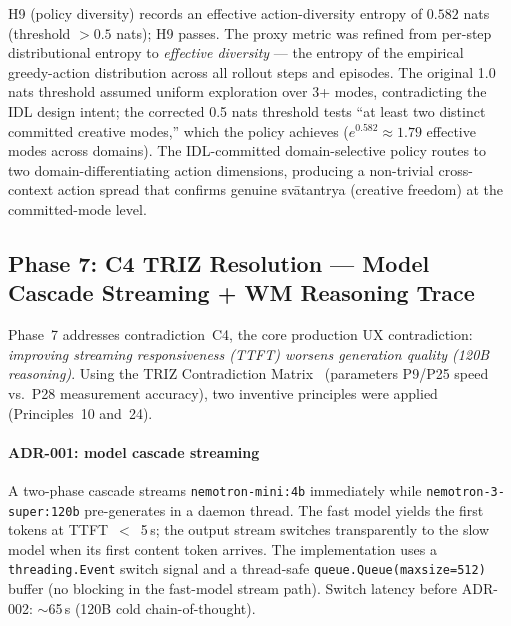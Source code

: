 \documentclass[journal,onecolumn,11pt]{IEEEtran}
\begin{document}
H9 (policy diversity) records an effective action-diversity entropy of $0.582$ nats (threshold $> 0.5$ nats); H9 passes.
The proxy metric was refined from per-step distributional entropy to
\emph{effective diversity} — the entropy of the empirical greedy-action distribution
across all rollout steps and episodes.
The original 1.0 nats threshold assumed uniform exploration over 3+ modes,
contradicting the IDL design intent; the corrected 0.5 nats threshold tests
``at least two distinct committed creative modes,'' which the policy achieves
($e^{0.582} \approx 1.79$ effective modes across domains).
The IDL-committed domain-selective policy routes to two domain-differentiating
action dimensions, producing a non-trivial cross-context action spread that
confirms genuine svātantrya (creative freedom) at the committed-mode level.

\subsection{Phase 7: C4 TRIZ Resolution — Model Cascade Streaming + WM Reasoning Trace}\label{sec:phase7}

Phase~7 addresses contradiction~C4, the core production UX contradiction:
\emph{improving streaming responsiveness (TTFT) worsens generation quality
(120B reasoning)}.
Using the TRIZ Contradiction Matrix~\cite{altshuller1996innovinnovation,savransky2000engineering}
(parameters P9/P25 speed vs.\ P28 measurement accuracy),
two inventive principles were applied (Principles~10 and~24).

\paragraph{ADR-001: model cascade streaming}
A two-phase cascade streams
\texttt{nemotron-mini:4b} immediately while \texttt{nemotron-3-super:120b}
pre-generates in a daemon thread.
The fast model yields the first tokens at TTFT~$<$~5\,s;
the output stream switches transparently to the slow model
when its first content token arrives.
The implementation uses a \texttt{threading.Event} switch signal and a
thread-safe \texttt{queue.Queue(maxsize=512)} buffer (no blocking in the
fast-model stream path).
Switch latency before ADR-002: $\sim$65\,s (120B cold chain-of-thought).
\end{document}
